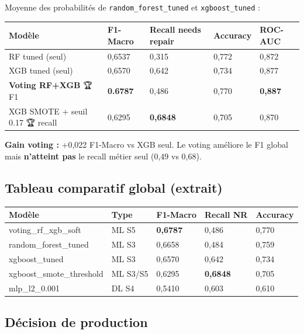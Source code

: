 \documentclass[11pt,a4paper]{report}
\begin{document}
Moyenne des probabilités de \texttt{random\_forest\_tuned} et \texttt{xgboost\_tuned} :

{\small
\begin{longtable}{@{}lllll@{}}
\toprule
\rowcolor{EHTPTableHead}Modèle & F1-Macro & Recall needs repair & Accuracy & ROC-AUC \\
\midrule
RF tuned (seul) & 0,6537 & 0,315 & 0,772 & 0,872 \\
XGB tuned (seul) & 0,6570 & 0,642 & 0,734 & 0,877 \\
\textbf{Voting RF+XGB} 🏆 F1 & \textbf{0.6787} & 0,486 & 0,770 & \textbf{0,887} \\
XGB SMOTE + seuil 0.17 🏆 recall & 0,6295 & \textbf{0,6848} & 0,705 & 0,870 \\
\bottomrule
\end{longtable}
}

\textbf{Gain voting :} +0,022 F1-Macro vs XGB seul. Le voting améliore le F1 global mais \textbf{n'atteint pas} le recall métier seul (0,49 vs 0,68).

\subsection{Tableau comparatif global (extrait)}

{\small
\begin{longtable}{@{}lllll@{}}
\toprule
\rowcolor{EHTPTableHead}Modèle & Type & F1-Macro & Recall NR & Accuracy \\
\midrule
voting\_rf\_xgb\_soft & ML S5 & \textbf{0,6787} & 0,486 & 0,770 \\
random\_forest\_tuned & ML S3 & 0,6658 & 0,484 & 0,759 \\
xgboost\_tuned & ML S3 & 0,6570 & 0,642 & 0,734 \\
xgboost\_smote\_threshold & ML S3/S5 & 0,6295 & \textbf{0,6848} & 0,705 \\
mlp\_l2\_0.001 & DL S4 & 0,5410 & 0,603 & 0,610 \\
\bottomrule
\end{longtable}
}

\subsection{Décision de production}
\end{document}
